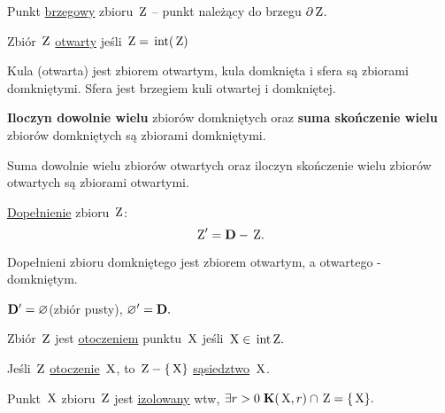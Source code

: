 \begin{mydef}
    Punkt \underline{brzegowy} zbioru $\mathbf{\,\textnormal{Z}}$ -- punkt należący do brzegu $\partial \mathbf{\,\textnormal{Z}}$.
\end{mydef}

\begin{mydef}
    Zbiór $\mathbf{\,\textnormal{Z}}$ \underline{otwarty} jeśli $\mathbf{\,\textnormal{Z}} = \,\textnormal{int}(\mathbf{\,\textnormal{Z}})$
\end{mydef}

\begin{info}
     Kula (otwarta) jest zbiorem otwartym, kula domknięta i sfera są zbiorami domkniętymi. Sfera jest brzegiem kuli otwartej i domkniętej.
\end{info}
\begin{info}
     \textbf{Iloczyn dowolnie wielu} zbiorów domkniętych oraz \textbf{suma skończenie wielu} zbiorów domkniętych są zbiorami domkniętymi.
\end{info}
\begin{info}
     Suma dowolnie wielu zbiorów otwartych oraz iloczyn skończenie wielu zbiorów otwartych są zbiorami otwartymi.
\end{info}

\begin{mydef}
     \underline{Dopełnienie} zbioru $\mathbf{\,\textnormal{Z}}$:
     \[\mathbf{\,\textnormal{Z}'} = \mathbf{D} - \mathbf{\,\textnormal{Z}}.\]
\end{mydef}

\begin{info}
     Dopełnieni zbioru domkniętego jest zbiorem otwartym, a otwartego - domkniętym.
\end{info}
\begin{info}
     $\mathbf{D}' = \varnothing$(zbiór pusty), $\varnothing' = \mathbf{D}.$
\end{info}

\begin{mydef}
     Zbiór $\mathbf{\,\textnormal{Z}}$ jest \underline{otoczeniem} punktu $\,\textnormal{X}$ jeśli $\,\textnormal{X}\in \,\textnormal{int}\mathbf{\,\textnormal{Z}}.$
\end{mydef}
\begin{mydef}
     Jeśli $\mathbf{\,\textnormal{Z}}$ \underline{otoczenie} $\,\textnormal{X}$, to $\mathbf{\,\textnormal{Z}} - \{\,\textnormal{X}\}$ \underline{sąsiedztwo} $\,\textnormal{X}$. 
\end{mydef}

\begin{mydef}
     Punkt $\,\textnormal{X}$ zbioru $\mathbf{\,\textnormal{Z}}$ jest \underline{izolowany} wtw, $\exists r>0\; \mathbf{K}(\,\textnormal{X}, r) \cap \mathbf{\,\textnormal{Z}} = \{\,\textnormal{X}\}.$
\end{mydef}

